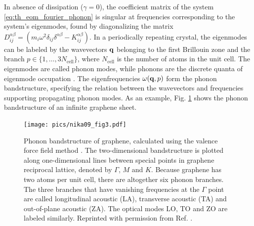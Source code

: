 
In absence of dissipation ($\gamma=0$), the coefficient matrix of the system \eqref{eq:th_eom_fourier_phonon} is singular at frequencies corresponding to the system's eigenmodes, found by diagonalizing the matrix $D_{ij}^{\alpha\beta} = (m_i\omega^2 \delta_{ij}\delta^{\alpha\beta}-K_{ij}^{\alpha\beta})$. In a periodically repeating crystal, the eigenmodes can be labeled by the wavevectors $\mathbf{q}$ belonging to the first Brillouin zone \cite{ziman} and the branch $p \in \{1,\dots,3N_{\textrm{cell}}\}$, where $N_{\textrm{cell}}$ is the number of atoms in the unit cell. The eigenmodes are called phonon modes, while phonons are the discrete quanta of eigenmode occupation \cite{ziman}. The eigenfrequencies $\omega(\mathbf{q},p)$ form the phonon bandstructure, specifying the relation between the wavevectors and frequencies supporting propagating phonon modes. As an example, Fig. \ref{fig:th_nika} shows the phonon bandstructure of an infinite graphene sheet.

\begin{figure}
\begin{center}
 \texttt{[image: pics/nika09\_fig3.pdf]}
 \caption{Phonon bandstructure of graphene, calculated using the valence force field method \cite{nika09}. The two-dimensional bandstructure is plotted along one-dimensional lines between special points in graphene reciprocal lattice, denoted by $\Gamma$, $M$ and $K$. Because graphene has two atoms per unit cell, there are altogether six phonon branches. The three branches that have vanishing frequencies at the $\Gamma$ point are called longitudinal acoustic (LA), transverse acoustic (TA) and out-of-plane acoustic (ZA). The optical modes LO, TO and ZO are labeled similarly. Reprinted with permission from Ref. \cite{nika09}.}
\label{fig:th_nika}
\end{center}
\end{figure} 

